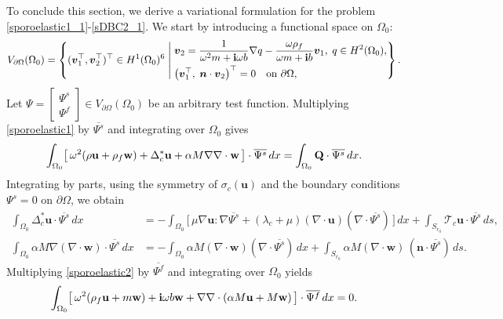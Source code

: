\documentclass[11pt]{article}
\newcommand{\pa}{\partial}
\newcommand{\Om}{\Omega}
\newcommand{\sig}{\sigma}
\newcommand{\la}{\lambda}
\newcommand{\bs}{\boldsymbol}
\begin{document}
To conclude this section, we derive a variational formulation for the problem
\eqref{sporoelastic1_1}-\eqref{sDBC2_1}. We start by introducing a functional space on $\Om_0$:
\begin{equation*}
V_{\pa\Om}(\Om_0) = \left\{
(\bs{v}_1^\top, \bs{v}_2^\top)^\top \in H^1(\Om_0)^6 \;\middle|\;
\begin{aligned}
&\bs{v}_2 = \frac{1}{\omega^2 m+{\bf i}\omega b} \nabla q - \frac{\omega\rho_f}{\omega m+{\bf i}b} \bs{v}_1, 
\; q \in H^2(\Om_0), \\
&\bigl(\bs{v}_1^\top,\; \bs{n} \cdot \bs{v}_2\bigr)^\top = 0 \quad \text{on } \pa\Om,
\end{aligned}
\right\}.
\end{equation*}
Let $\Psi=\begin{bmatrix}
\Psi^s   \\
\Psi^f 
\end{bmatrix}\in V_{\pa\Om}(\Om_0)$ be an arbitrary test function. Multiplying \eqref{sporoelastic1} 
by $\overline{\Psi^s}$ and integrating
over $\Om_0$ gives
\begin{equation*}
\int_{\Om_0} \bigl[\,\omega^2(\rho\mathbf{u}+\rho_f\mathbf{w})
+ \Delta_c^*\mathbf{u} + \alpha M\nabla\nabla\cdot\mathbf{w}\,\bigr]\cdot\overline{\Psi^s}\,dx
= \int_{\Om_0} {\bf Q}\cdot\overline{\Psi^s}\,dx .
\end{equation*}
Integrating by parts, using the symmetry of $\sig_c(\mathbf{u})$
and the boundary conditions $\Psi^s = 0$ on $\pa\Om$, we obtain
\begin{equation*}
\begin{aligned}
\int_{\Om_0} \Delta_c^*\mathbf{u}\cdot\overline{\Psi^s}\,dx
&= -\int_{\Om_0} \bigl[\,\mu\nabla\mathbf{u}:\nabla\overline{\Psi^s}
+ (\la_c+\mu)(\nabla\cdot\mathbf{u})(\nabla\cdot\overline{\Psi^s})\,\bigr]\,dx
+ \int_{S_{r_0}} \mathcal{T}_c\mathbf{u}\cdot\overline{\Psi^s}\,ds, \\
\int_{\Om_0} \alpha M\nabla(\nabla\cdot\mathbf{w})\cdot\overline{\Psi^s}\,dx
&= -\int_{\Om_0} \alpha M(\nabla\cdot\mathbf{w})(\nabla\cdot\overline{\Psi^s})\,dx
+ \int_{S_{r_0}} \alpha M(\nabla\cdot\mathbf{w})\,(\bs{n}\cdot\overline{\Psi^s})\,ds.
\end{aligned}
\end{equation*}
Multiplying \eqref{sporoelastic2} by $\overline{\Psi^f}$ and integrating
over $\Om_0$ yields
\begin{equation*}
\int_{\Om_0} \bigl[\,\omega^2(\rho_f\mathbf{u}+m\mathbf{w})
+ {\bf i}\omega b\mathbf{w}
+ \nabla\nabla\cdot(\alpha M\mathbf{u}+M\mathbf{w})\,\bigr]\cdot\overline{\Psi^f}\,dx = 0 .
\end{equation*}
\end{document}
